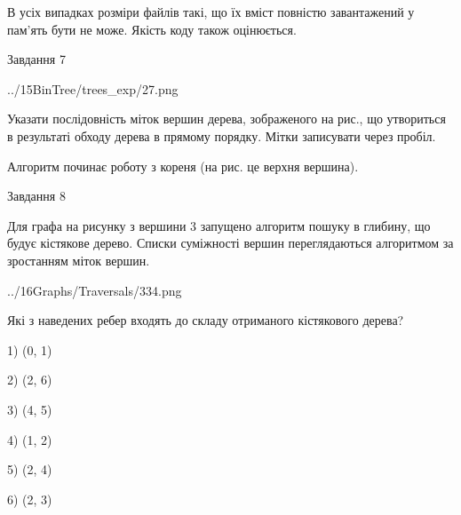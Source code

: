 \documentclass[12pt, ukrainian]{article}
\begin{document}
{В усіх випадках розміри файлів такі, що їх вміст повністю завантажений у пам'ять бути не може. Якість коду також оцінюється.



\vspace{10mm}\par

\newpage
\begin{minipage}[t]{9.7cm}
               
{\begin{center}Завдання {7}\end{center}}
\vspace{-4mm}

\begin{center}
	{../15BinTree/trees_exp/27.png}
\end{center}
Указати послідовність міток вершин дерева, зображеного на рис., що утвориться в результаті обходу дерева в прямому порядку. Мітки записувати через пробіл.\par Алгоритм починає роботу з кореня (на рис. це верхня вершина).\par

\end{minipage}
\vline \hspace{8mm}
\begin{minipage}[t]{8.0cm}
               
{\begin{center}Завдання {8}\end{center}}
\vspace{-4mm}
Для графа на рисунку з вершини 3 запущено алгоритм пошуку в глибину, що будує кістякове дерево. Списки суміжності вершин переглядаються алгоритмом за зростанням міток вершин.\par
\begin{center}
	{../16Graphs/Traversals/334.png}
\end{center}
\par Які з наведених ребер входять до складу отриманого кістякового дерева?\par
1) (0, 1)\par
2) (2, 6)\par
3) (4, 5)\par
4) (1, 2)\par
5) (2, 4)\par
6) (2, 3)\par
{\vskip 15pt} \par


\end{minipage}}
\end{document}
